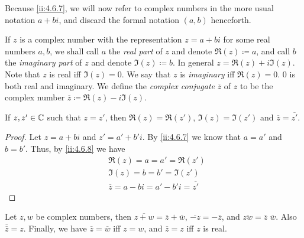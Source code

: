 \begin{note}
  Because \cref{ii:4.6.7}, we will now refer to complex numbers in the more usual notation \(a + bi\), and discard the formal notation \((a, b)\) henceforth.
\end{note}

\begin{defn}\label{ii:4.6.8}
  If \(z\) is a complex number with the representation \(z = a + bi\) for some real numbers \(a, b\), we shall call \(a\) the \emph{real part} of \(z\) and denote \(\Re(z) \coloneqq a\), and call \(b\) the \emph{imaginary part} of \(z\) and denote \(\Im(z) \coloneqq b\).
  In general \(z = \Re(z) + i \Im(z)\).
  Note that \(z\) is real iff \(\Im(z) = 0\).
  We say that \(z\) is \emph{imaginary} iff \(\Re(z) = 0\).
  \(0\) is both real and imaginary.
  We define the \emph{complex conjugate} \(\overline{z}\) of \(z\) to be the complex number \(\overline{z} \coloneqq \Re(z) - i \Im(z)\).
\end{defn}

\begin{ac}\label{ii:ac:4.6.4}
  If \(z, z' \in \mathbb{C}\) such that \(z = z'\), then \(\Re(z) = \Re(z')\), \(\Im(z) = \Im(z')\) and \(\overline{z} = \overline{z'}\).
\end{ac}

\begin{proof}
  Let \(z = a + bi\) and \(z' = a' + b' i\).
  By \cref{ii:4.6.7} we know that \(a = a'\) and \(b = b'\).
  Thus, by \cref{ii:4.6.8} we have
  \begin{align*}
     & \Re(z) = a = a' = \Re(z')                         \\
     & \Im(z) = b = b' = \Im(z')                         \\
     & \overline{z} = a - bi = a' - b' i = \overline{z'}
  \end{align*}
\end{proof}

\begin{lem}\label{ii:4.6.9}
  Let \(z, w\) be complex numbers, then \(\overline{z + w} = \overline{z} + \overline{w}\), \(\overline{-z} = -\overline{z}\), and \(\overline{zw} = \overline{z} \; \overline{w}\).
  Also \(\overline{\overline{z}} = z\).
  Finally, we have \(\overline{z} = \overline{w}\) iff \(z = w\), and \(\overline{z} = z\) iff \(z\) is real.
\end{lem}

